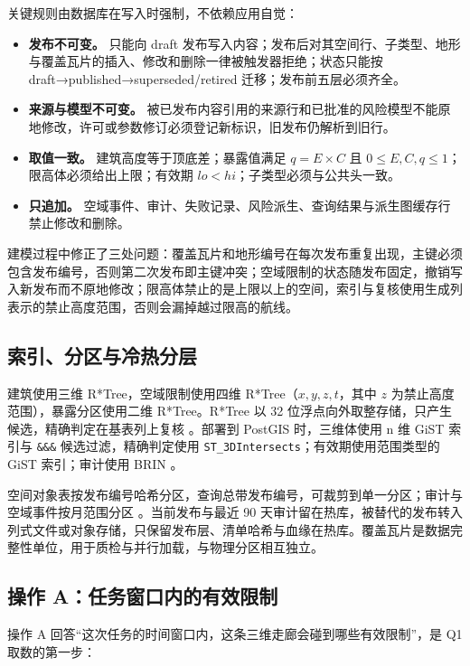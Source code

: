 \documentclass[a4paper,11pt,UTF8]{ctexart}
\begin{document}
关键规则由数据库在写入时强制，不依赖应用自觉：

\begin{itemize}
\item \textbf{发布不可变。} 只能向 draft 发布写入内容；发布后对其空间行、子类型、地形与覆盖瓦片的插入、修改和删除一律被触发器拒绝；状态只能按 draft→published→superseded/retired 迁移；发布前五层必须齐全。
\item \textbf{来源与模型不可变。} 被已发布内容引用的来源行和已批准的风险模型不能原地修改，许可或参数修订必须登记新标识，旧发布仍解析到旧行。
\item \textbf{取值一致。} 建筑高度等于顶底差；暴露值满足 $q = E\times C$ 且 $0\le E,C,q\le 1$；限高体必须给出上限；有效期 $\mathit{lo}<\mathit{hi}$；子类型必须与公共头一致。
\item \textbf{只追加。} 空域事件、审计、失败记录、风险派生、查询结果与派生图缓存行禁止修改和删除。
\end{itemize}

建模过程中修正了三处问题：覆盖瓦片和地形编号在每次发布重复出现，主键必须包含发布编号，否则第二次发布即主键冲突；空域限制的状态随发布固定，撤销写入新发布而不原地修改；限高体禁止的是上限以上的空间，索引与复核使用生成列表示的禁止高度范围，否则会漏掉越过限高的航线。

\subsection{索引、分区与冷热分层}

建筑使用三维 R*Tree，空域限制使用四维 R*Tree（$x,y,z,t$，其中 $z$ 为禁止高度范围），暴露分区使用二维 R*Tree。R*Tree 以 32 位浮点向外取整存储，只产生候选，精确判定在基表列上复核 \cite{sqlite-rtree}。部署到 PostGIS 时，三维体使用 n 维 GiST 索引与 \texttt{\&\&\&} 候选过滤，精确判定使用 \texttt{ST\_3DIntersects}；有效期使用范围类型的 GiST 索引；审计使用 BRIN \cite{postgis-index,postgis-3dint,pg-gist,pg-range,pg-brin}。

空间对象表按发布编号哈希分区，查询总带发布编号，可裁剪到单一分区；审计与空域事件按月范围分区 \cite{pg-partition}。当前发布与最近 90 天审计留在热库，被替代的发布转入列式文件或对象存储，只保留发布层、清单哈希与血缘在热库。覆盖瓦片是数据完整性单位，用于质检与并行加载，与物理分区相互独立。

\subsection{操作 A：任务窗口内的有效限制}

操作 A 回答“这次任务的时间窗口内，这条三维走廊会碰到哪些有效限制”，是 Q1 取数的第一步：
\end{document}
